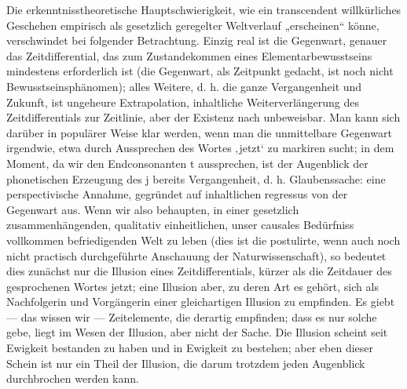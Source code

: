Die erkenntnisstheoretische Hauptschwierigkeit, wie ein transcendent willkürliches Geschehen empirisch als gesetzlich geregelter Weltverlauf „erscheinen“ könne, verschwindet bei folgender Betrachtung. Einzig real ist die Gegenwart, genauer das Zeitdifferential, das zum Zustandekommen eines Elementarbewusstseins mindestens erforderlich ist (die Gegenwart, als Zeitpunkt gedacht, ist noch nicht Bewusstseinsphänomen); alles Weitere, d. h. die ganze Vergangenheit und Zukunft, ist ungeheure Extrapolation, inhaltliche Weiterverlängerung des Zeitdifferentials zur Zeitlinie, aber der Existenz nach unbeweisbar. Man kann sich darüber in populärer Weise klar werden, wenn man die unmittelbare Gegenwart irgendwie, etwa durch Aussprechen des Wortes ‚jetzt‘ zu markiren sucht; in dem Moment, da wir den Endconsonanten t aussprechen, ist der Augenblick der phonetischen Erzeugung des j bereits Vergangenheit, d. h. Glaubenssache: eine perspectivische Annahme, gegründet auf inhaltlichen regressus von der Gegenwart aus. Wenn wir also behaupten, in einer gesetzlich zusammenhängenden, qualitativ einheitlichen, unser causales Bedürfniss vollkommen befriedigenden Welt zu leben (dies ist die postulirte, wenn auch noch nicht practisch durchgeführte Anschauung der Naturwissenschaft), so bedeutet dies zunächst nur die Illusion eines Zeitdifferentials, kürzer als die Zeitdauer des gesprochenen Wortes jetzt; eine Illusion aber, zu deren Art es gehört, sich als Nachfolgerin und Vorgängerin einer gleichartigen Illusion zu empfinden. Es giebt — das wissen wir — Zeitelemente, die derartig empfinden; dass es nur solche gebe, liegt im Wesen der Illusion, aber nicht der Sache. Die Illusion scheint seit Ewigkeit bestanden zu haben und in Ewigkeit zu bestehen; aber eben dieser Schein ist nur ein Theil der Illusion, die darum trotzdem jeden Augenblick durchbrochen werden kann.
\par

